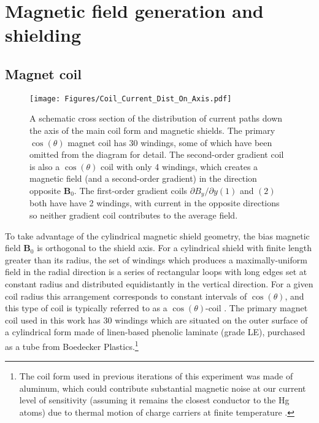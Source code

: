 \documentclass [10pt, twoside] {uwthesis}[2012/04/02]
\begin{document}
\section{Magnetic field generation and shielding}
\subsection{Magnet coil}	
\begin{figure}[ht]
\begin{center}
\texttt{[image: Figures/Coil\_Current\_Dist\_On\_Axis.pdf]}
\end{center}
\caption[$\cos(\theta)$ coil and vertical gradient coil current pattern]
{\narrower A schematic cross section of the distribution of current paths down the axis of the main coil form and magnetic shields. The primary $\cos(\theta)$ magnet coil has 30 windings, some of which have been omitted from the diagram for detail. The second-order gradient coil is also a $\cos(\theta)$ coil with only 4 windings, which creates a magnetic field (and a second-order gradient) in the direction opposite $\mathbf{B}_0$. The first-order gradient coils $\partial B_y/\partial y (1)$ and $(2)$ both have have 2 windings, with current in the opposite directions so neither gradient coil contributes to the average field.}
\label{Coil_Currents_On_Axis}
\end{figure}

To take advantage of the cylindrical magnetic shield geometry, the bias magnetic field $\mathbf{B}_0$ is orthogonal to the shield axis. For a cylindrical shield with finite length greater than its radius, the set of windings which produces a maximally-uniform field in the radial direction is a series of rectangular loops with long edges set at constant radius and distributed equidistantly in the vertical direction. For a given coil radius this arrangement corresponds to constant intervals of $\cos(\theta)$, and this type of coil is typically referred to as a $\cos(\theta)$-coil \cite{Griffith}. The primary magnet coil used in this work has 30 windings which are situated on the outer surface of a cylindrical form made of linen-based phenolic laminate (grade LE), purchased as a tube from Boedecker Plastics.\footnote{The coil form used in previous iterations of this experiment was made of aluminum, which could contribute substantial magnetic noise at our current level of sensitivity (assuming it remains the closest conductor to the Hg atoms) due to thermal motion of charge carriers at finite temperature \cite{Swallows}.}
\end{document}
